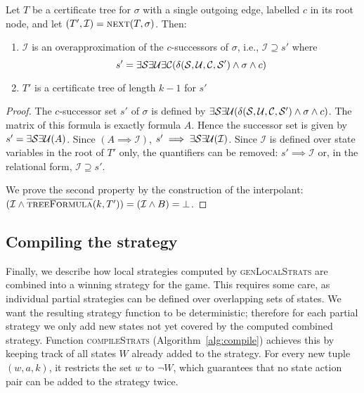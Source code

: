\begin{proposition}\label{prop:next}
    Let $T$ be a certificate tree for $\sigma$ with a single outgoing edge, labelled $c$ in its root node, and let $(T',\mathcal{I})
    = \textsc{next}(T,\sigma)$.
    Then:
    \begin{enumerate}
        \item $\mathcal{I}$ is an overapproximation of the $c$-successors of $\sigma$, i.e., $\mathcal{I} \supseteq s'$ where $$s' = \exists \mathcal{S} \exists \mathcal{U} \exists \mathcal{C} (\delta(\mathcal{S}, \mathcal{U}, \mathcal{C}, \mathcal{S}') \land \sigma \land c)$$
        \item $T'$ is a certificate tree of length $k-1$ for $s'$
    \end{enumerate}
\end{proposition}
\begin{proof}
    The $c$-successor set $s'$ of $\sigma$ is defined by $\exists \mathcal{S} \exists \mathcal{U} (\delta(\mathcal{S}, \mathcal{U}, \mathcal{C}, \mathcal{S}') \land \sigma \land c)$. The matrix of this formula is exactly formula $A$.  Hence the successor set is given by $s' = \exists \mathcal{S} \exists \mathcal{U} (A)$.  Since $(A \implies \mathcal{I})$, $s' \implies \exists \mathcal{S} \exists \mathcal{U} (\mathcal{I})$.  Since $\mathcal{I}$ is defined over state variables in the root of $T'$ only, the quantifiers can be removed: $s' \implies \mathcal{I}$ or, in the relational form, $\mathcal{I} \supseteq s'$.
    
    We prove the second property by the construction of the interpolant: $(\mathcal{I} \land \textsc{$\overline{\mbox{treeFormula}}$}(k, T')) = (\mathcal{I} \land B) = \bot$.
\end{proof}

\subsection{Compiling the strategy}

Finally, we describe how local strategies computed by \textsc{genLocalStrats} are combined into a winning strategy for the game.  This requires some care, as individual partial strategies can be defined over overlapping sets of states.  We want the resulting strategy function to be deterministic; therefore for each partial strategy we only add new states not yet covered by the computed combined strategy.  Function \textsc{compileStrats} (Algorithm~\ref{alg:compile}) achieves this by keeping track of all states $W$ already added to the strategy.  For every new tuple $(w, a, k)$, it restricts the set $w$ to $\neg W$, which guarantees that no state action pair can be added to the strategy twice.  

